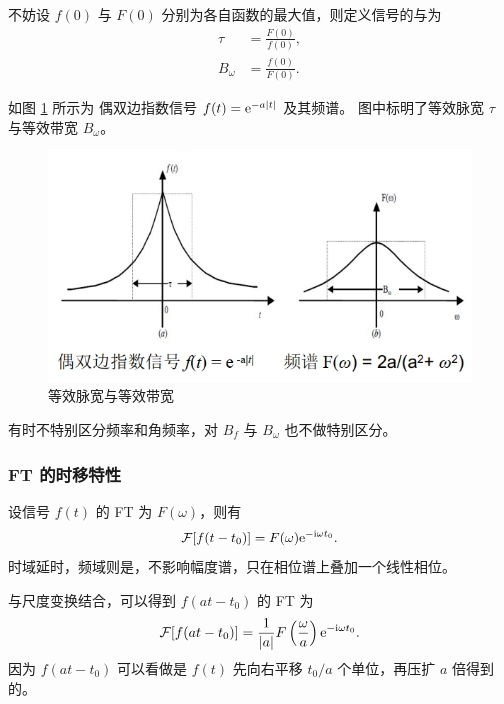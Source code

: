 \begin{definition}[等效脉宽与等效带宽]
    不妨设 $f(0)$ 与 $F(0)$ 分别为各自函数的最大值，则定义信号的与为
    \begin{align*}
        \tau & = \frac{F(0)}{f(0)}, \\
        B_\omega & = \frac{f(0)}{F(0)}.
    \end{align*}
\end{definition}

\begin{example}
    如图 \ref{fig:equivalent-bandwidth-and-pulse-width} 所示为
    偶双边指数信号 $f(t) = \mathrm{e}^{-a|t|}$ 及其频谱。
    图中标明了等效脉宽 $\tau$ 与等效带宽 $B_\omega$。
    \begin{figure}[H]
        \centering
        \includegraphics[width = 0.6\linewidth]{chap2/img/equivalent-bandwidth-and-pulse-width.png}
        \caption{等效脉宽与等效带宽}
        \label{fig:equivalent-bandwidth-and-pulse-width}
    \end{figure}
\end{example}

\begin{note}
    有时不特别区分频率和角频率，对 $B_f$ 与 $B_\omega$ 也不做特别区分。
\end{note}

\subsubsection{FT 的时移特性}

\begin{property}
    设信号 $f(t)$ 的 FT 为 $F(\omega)$，则有
    \begin{align*}
        \mathcal{F}[f(t - t_0)] = F(\omega)\mathrm{e}^{-\mathrm{i}\omega t_0}.
    \end{align*}
    时域延时，频域则是，不影响幅度谱，只在相位谱上叠加一个线性相位。

    与尺度变换结合，可以得到 $f(at - t_0)$ 的 FT 为
    \begin{align*}
        \mathcal{F}[f(at - t_0)] = \frac{1}{|a|}F\left(\frac{\omega}{a}\right)\mathrm{e}^{-\mathrm{i}\omega t_0}.
    \end{align*}
    因为 $f(at - t_0)$ 可以看做是 $f(t)$ 先向右平移 $t_0 / a$ 个单位，再压扩 $a$ 倍得到的。
\end{property}

